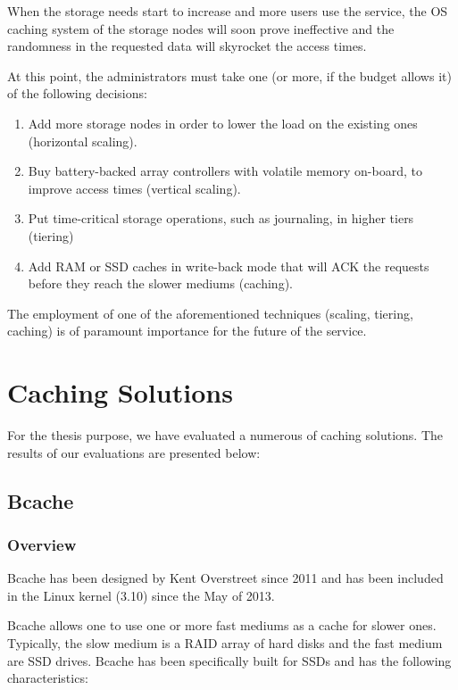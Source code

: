 When the storage needs start to increase and more users use the service, the OS 
caching system of the storage nodes will soon prove ineffective and the 
randomness in the requested data will skyrocket the access times.

At this point, the administrators must take one (or more, if the budget allows 
it) of the following decisions:

\begin{enumerate}
	\item Add more storage nodes in order to lower the load on the existing 
		ones (horizontal scaling).
	\item Buy battery-backed array controllers with volatile memory on-board, 
		to improve access times (vertical scaling).
	\item Put time-critical storage operations, such as journaling, in higher 
		tiers (tiering)
	\item Add RAM or SSD caches in write-back mode that will ACK the requests 
		before they reach the slower mediums (caching).
\end{enumerate}

The employment of one of the aforementioned techniques (scaling, tiering, 
caching) is of paramount importance for the future of the service.

\section{Caching Solutions}

For the thesis purpose, we have evaluated a numerous of caching solutions. The 
results of our evaluations are presented below:

\subsection{Bcache}

\subsubsection{Overview}

Bcache has been designed by Kent Overstreet since 2011 and has been included in 
the Linux kernel (3.10) since the May of 2013.

Bcache allows one to use one or more fast mediums as a cache for slower ones.  
Typically, the slow medium is a RAID array of hard disks and the fast medium 
are SSD drives. Bcache has been specifically built for SSDs and has the 
following characteristics:

